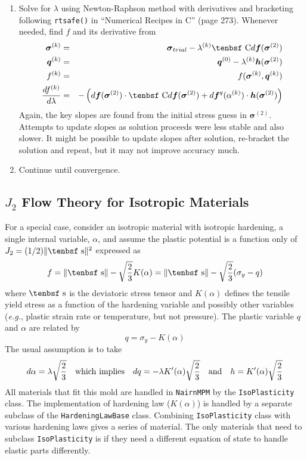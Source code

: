 \documentclass[11pt]{article}
\renewcommand{\vec}[1]{\boldsymbol{#1}}
\def\C{\hbox{\tenbsf C}}
\def\dev{\hbox{\tenbsf s}}
\def\df{d \vec{f}}
\def\dfq{d \vec{f}^q}
\begin{document}
\begin{enumerate}
\item Solve for $\lambda$ using Newton-Raphson method with derivatives and bracketing following {\tt rtsafe()} in ``Numerical Recipes in C'' (page 273). Whenever needed, find $f$ and its derivative from
\begin{eqnarray}
      {\vec\sigma}^{(k)} & = & {\vec\sigma_{trial}} - \lambda^{(k)}\C\df({\vec\sigma}^{(2)}) \\
      \vec q^{(k)} & = & \vec q^{(0)} - \lambda^{(k)} \vec h({\vec\sigma}^{(2)}) \\
      f^{(k)} & = &  f({\vec\sigma}^{(k)},\vec q^{(k)})  \\
      {df^{(k)}\over d\lambda} & = & -\left( \df({\vec\sigma}^{(2)})\cdot \C\df({\vec\sigma}^{(2)}) + \dfq(\alpha^{(k)}) \cdot \vec h({\vec\sigma}^{(2)})\right) 
\end{eqnarray}
Again, the key slopes are found from the initial stress guess in ${\vec\sigma}^{(2)}$. Attempts to update slopes as solution proceeds were less stable and also slower. It might be possible to update slopes after solution, re-bracket the solution and repeat, but it may not improve accuracy much.

\item Continue until convergence.

\end{enumerate}

\subsection{$J_2$ Flow Theory for Isotropic Materials}

For a special case, consider an isotropic material with isotropic hardening, a single internal variable, $\alpha$, and assume the plastic potential is a function only of $J_2= (1/2)\|\dev\|^2$ expressed as
\begin{equation}
      f = \|\dev\| - \sqrt{2\over3} K(\alpha) = \|\dev\| - \sqrt{2\over3}(\sigma_y - q)
\end{equation}
where $\dev$ is the deviatoric stress tensor and $K(\alpha)$ defines the tensile yield stress as a function of the hardening variable and possibly other variables ({\it e.g.}, plastic strain rate or temperature, but not pressure). The plastic variable $q$ and $\alpha$ are related by
\begin{equation}
      q  = \sigma_y - K(\alpha)
\end{equation}
The usual assumption is to take
\begin{equation}
        d\alpha = \lambda\sqrt{2\over3}  \quad{\rm which\ implies} 
        \quad dq = -\lambda K'(\alpha)\sqrt{2\over3}  \quad{\rm and} 
        \quad h = K'(\alpha)\sqrt{2\over3}
\end{equation}
All materials that fit this mold are handled in {\tt NairnMPM} by the {\tt IsoPlasticity} class. The implementation of hardening law ($K(\alpha)$) is handled by a separate subclass of the {\tt HardeningLawBase} class. Combining {\tt IsoPlasticity} class with various hardening laws gives a series of material. The only materials that need to subclass {\tt IsoPlasticity} is if they need a different equation of state to handle elastic parts differently.
\end{document}
